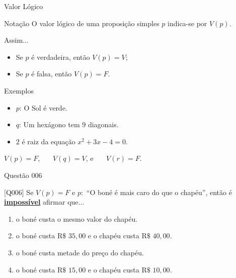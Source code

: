 \documentclass[xcolor=dvipsnames,table]{beamer}
\begin{document}
 	\begin{frame}{Valor Lógico}
 		\begin{block}{Notação}
 			O valor lógico de uma proposição simples $p$ indica-se por $V(p)$.
 		\end{block} \pause
 		\begin{block}{Assim...}
 			\begin{itemize}[label=-]
 				\item Se $p$ é verdadeira, então $V(p) = V$; \pause
 				\item Se $p$ é falsa, então $V(p) = F$.
 			\end{itemize}
 		\end{block} \pause
 		\begin{exampleblock}{Exemplos}
 			\begin{itemize}[label=-]
 				\item $p$: O Sol é verde.
 				\item $q$: Um hexágono tem 9 diagonais.
 				\item 2 é raiz da equação $x^2 + 3x -4 = 0$.
 			\end{itemize} \pause
		
 			\begin{center}
 				$V(p) = F$, \ \ \ $V(q) = V$, e \ \ \ $V(r)= F$.
 			\end{center}
			
 		\end{exampleblock}
 	\end{frame}

 	\begin{frame}{Questão 006}		
 		\begin{block}{[Q006]}
 			Se $V(p) = F$ e $p:$ ``O boné é mais caro do que o chapéu'', então é \underline{\bf impossível} afirmar que...
 		\end{block}
 		\begin{enumerate}[label=(\Alph*)]
 			\item o boné custa o mesmo valor do chapéu.
 			\item o boné custa R$\$$ $35,00$ e o chapéu custa R$\$$ $40,00$.
 			\item o boné custa metade do preço do chapéu.
 			\item o boné custa R$\$$ $15,00$ e o chapéu custa R$\$$ $10,00$.
 		\end{enumerate}
 	\end{frame}
\end{document}
